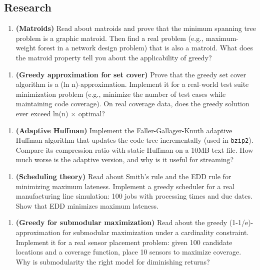 \subsection{Research}

\begin{enumerate}
\item \textbf{(Matroids)} Read about matroids and prove that the minimum spanning tree problem is a graphic matroid. Then find a real problem (e.g., maximum-weight forest in a network design problem) that is also a matroid. What does the matroid property tell you about the applicability of greedy?
\end{enumerate}

\begin{enumerate}
\item \textbf{(Greedy approximation for set cover)} Prove that the greedy set cover algorithm is a (ln n)-approximation. Implement it for a real-world test suite minimization problem (e.g., minimize the number of test cases while maintaining code coverage). On real coverage data, does the greedy solution ever exceed ln(n) $\times $ optimal?
\end{enumerate}

\begin{enumerate}
\item \textbf{(Adaptive Huffman)} Implement the Faller-Gallager-Knuth adaptive Huffman algorithm that updates the code tree incrementally (used in \texttt{bzip2}). Compare its compression ratio with static Huffman on a 10MB text file. How much worse is the adaptive version, and why is it useful for streaming?
\end{enumerate}

\begin{enumerate}
\item \textbf{(Scheduling theory)} Read about Smith's rule and the EDD rule for minimizing maximum lateness. Implement a greedy scheduler for a real manufacturing line simulation: 100 jobs with processing times and due dates. Show that EDD minimizes maximum lateness.
\end{enumerate}

\begin{enumerate}
\item \textbf{(Greedy for submodular maximization)} Read about the greedy (1-1/e)-approximation for submodular maximization under a cardinality constraint. Implement it for a real sensor placement problem: given 100 candidate locations and a coverage function, place 10 sensors to maximize coverage. Why is submodularity the right model for diminishing returns?
\end{enumerate}

